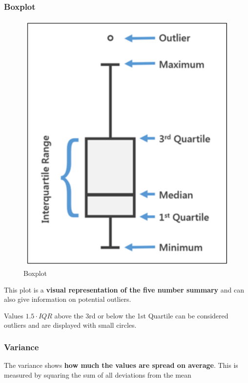 \documentclass[11pt]{article}
\begin{document}
\subsubsection{Boxplot}

\begin{figure}
    \centering
    \includegraphics[keepaspectratio=true,height=14\baselineskip]{boxplot.png}
    \caption{Boxplot}
    \label{fig:boxplot}
\end{figure}

This plot is a \textbf{visual representation of the five number summary} and can also give information on potential outliers.

Values $1.5 \cdot IQR$ above the 3rd or below the 1st Quartile can be considered outliers and are displayed with small circles.

\subsubsection{Variance} \label{sec:variance}
The variance shows \textbf{how much the values are spread on average}. This is measured by squaring the sum of all deviations from the mean
\end{document}
